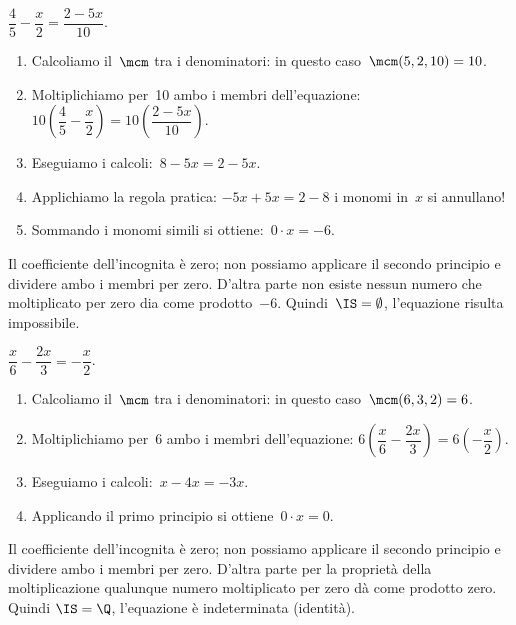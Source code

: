  \begin{esempio}
 \(\dfrac{4}{5}-\dfrac{x}{2}=\dfrac{2-5x}{10}\).

 \begin{enumerate} [nosep]
  \item Calcoliamo il~\(\mcm\) tra i denominatori: in questo
caso~\(\mcm(5, 2, 10) = 10\).
  \item Moltiplichiamo per~10 ambo i membri
dell'equazione:
\(10\left(\dfrac{4}{5}-\dfrac{x}{2}\right)=10\left(\dfrac{2-5x}{10}\right)\).
  \item Eseguiamo i calcoli:~\(8-5x=2-5x\).
  \item Applichiamo la regola pratica:
\(-5x+5x=2-8\) i monomi in~\(x\) si annullano!
  \item Sommando i monomi simili si ottiene:~\(0\cdot x=-6\).
 \end{enumerate}

Il coefficiente dell'incognita è zero; non possiamo
applicare il secondo principio e dividere ambo i membri per zero.
D'altra parte non esiste nessun numero che moltiplicato
per zero dia come prodotto~\(-6\). Quindi~\(\IS =\emptyset \),
l'equazione risulta impossibile.
 \end{esempio}

 \begin{esempio}
\(\dfrac{x}{6}-\dfrac{2x}{3}=-{\dfrac{x}{2}}\).

\begin{enumerate} [nosep]
 \item Calcoliamo il~\(\mcm\) tra i denominatori: in questo
caso~\(\mcm(6, 3, 2) = 6\).
 \item Moltiplichiamo per~6 ambo i membri
dell'equazione:
\(6\left(\dfrac{x}{6}-\dfrac{2x}{3}\right)=6\left(-{\dfrac{x}{2}}\right)\).
 \item Eseguiamo i calcoli:~\(x-4x=-3x\).
 \item Applicando il primo principio si ottiene~\(0\cdot x=0\).
\end{enumerate}

Il coefficiente dell'incognita è zero; non possiamo
applicare il secondo principio e dividere ambo i membri per zero.
D'altra parte per la proprietà della moltiplicazione
qualunque numero moltiplicato per zero dà come prodotto zero. Quindi
\(\IS = \Q\), l'equazione è indeterminata (identità).
 \end{esempio}


